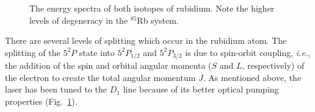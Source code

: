 \begin{figure}[h]
\begin{center}
\hspace{-1mm}
\vspace{-2mm}
\vspace{-2mm}
\caption{\small{The energy spectra of both isotopes of rubidium. Note the higher levels of degeneracy in the $^{85}$Rb system.}}
\label{fig:8587levels}
\end{center}
\end{figure}

There are several levels of splitting which occur in the rubidium atom. The
splitting of the $5^2P$ state into $5^2P_{1/2}$ and $5^2P_{3/2}$ is
due to spin-orbit coupling, \emph{i.e.}, the addition of the spin and
orbital angular momenta ($S$ and $L$, respectively) of the electron
to create the total angular momentum $J$. As mentioned above, the
laser has been tuned to the $D_1$ line because of its better optical
pumping properties (Fig.~\ref{fig:8587levels}).

